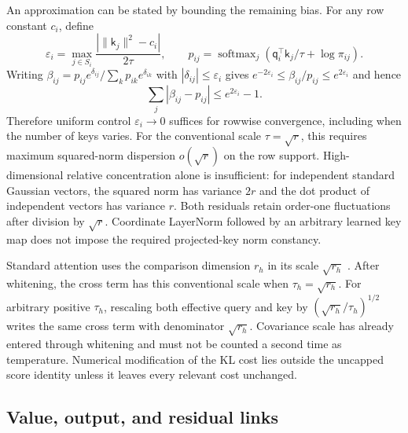 \documentclass[twoside,11pt]{article}
\newcommand{\softmax}{\operatorname{softmax}}
\begin{document}
An approximation can be stated by bounding the remaining bias. For any row constant $c_i$, define
\begin{equation}
\varepsilon_i=\max_{j\in S_i}
\frac{|\|\mathsf k_j\|^2-c_i|}{2\tau},\qquad
p_{ij}=\softmax_j\left(\mathsf q_i^\top\mathsf k_j/\tau+\log\pi_{ij}\right).
\label{eq:projected_bias_error}
\end{equation}
Writing $\beta_{ij}=p_{ij}e^{\delta_{ij}}/\sum_kp_{ik}e^{\delta_{ik}}$ with $|\delta_{ij}|\le\varepsilon_i$ gives $e^{-2\varepsilon_i}\le\beta_{ij}/p_{ij}\le e^{2\varepsilon_i}$ and hence
\begin{equation}
\sum_j|\beta_{ij}-p_{ij}|\le e^{2\varepsilon_i}-1.
\label{eq:projected_softmax_bound}
\end{equation}
Therefore uniform control $\varepsilon_i\to0$ suffices for rowwise convergence, including when the number of keys varies. For the conventional scale $\tau=\sqrt r$, this requires maximum squared-norm dispersion $o(\sqrt r)$ on the row support. High-dimensional relative concentration alone is insufficient: for independent standard Gaussian vectors, the squared norm has variance $2r$ and the dot product of independent vectors has variance $r$. Both residuals retain order-one fluctuations after division by $\sqrt r$. Coordinate LayerNorm followed by an arbitrary learned key map does not impose the required projected-key norm constancy.

Standard attention uses the comparison dimension \(r_h\) in its scale \(\sqrt{r_h}\) \citep[Sec.~3.2.1]{vaswani2017attention}. After whitening, the cross term has this conventional scale when \(\tau_h=\sqrt{r_h}\). For arbitrary positive \(\tau_h\), rescaling both effective query and key by \((\sqrt{r_h}/\tau_h)^{1/2}\) writes the same cross term with denominator \(\sqrt{r_h}\). Covariance scale has already entered through whitening and must not be counted a second time as temperature. Numerical modification of the KL cost lies outside the uncapped score identity unless it leaves every relevant cost unchanged.

\subsection{Value, output, and residual links}
\label{sec:value_aggregation}
\label{sec:multihead}
\end{document}
